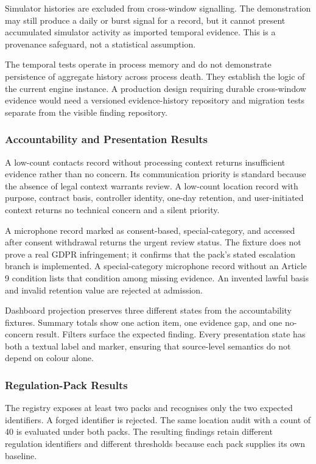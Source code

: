 Simulator histories are excluded from cross-window signalling. The demonstration may still produce a daily or burst signal for a record, but it cannot present accumulated simulator activity as imported temporal evidence. This is a provenance safeguard, not a statistical assumption.

The temporal tests operate in process memory and do not demonstrate persistence of aggregate history across process death. They establish the logic of the current engine instance. A production design requiring durable cross-window evidence would need a versioned evidence-history repository and migration tests separate from the visible finding repository.

\subsubsection{Accountability and Presentation Results}

A low-count contacts record without processing context returns insufficient evidence rather than no concern. Its communication priority is standard because the absence of legal context warrants review. A low-count location record with purpose, contract basis, controller identity, one-day retention, and user-initiated context returns no technical concern and a silent priority.

A microphone record marked as consent-based, special-category, and accessed after consent withdrawal returns the urgent review status. The fixture does not prove a real GDPR infringement; it confirms that the pack's stated escalation branch is implemented. A special-category microphone record without an Article 9 condition lists that condition among missing evidence. An invented lawful basis and invalid retention value are rejected at admission.

Dashboard projection preserves three different states from the accountability fixtures. Summary totals show one action item, one evidence gap, and one no-concern result. Filters surface the expected finding. Every presentation state has both a textual label and marker, ensuring that source-level semantics do not depend on colour alone.

\subsubsection{Regulation-Pack Results}

The registry exposes at least two packs and recognises only the two expected identifiers. A forged identifier is rejected. The same location audit with a count of 40 is evaluated under both packs. The resulting findings retain different regulation identifiers and different thresholds because each pack supplies its own baseline.

